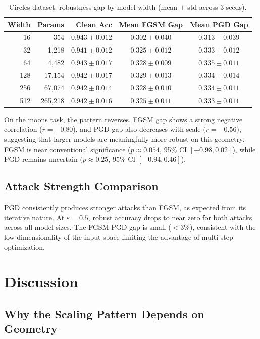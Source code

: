 \documentclass[11pt,a4paper]{article}
\begin{document}
\begin{table}[h]
\centering
\caption{Circles dataset: robustness gap by model width (mean $\pm$ std across 3 seeds).}
\label{tab:circles}
\begin{tabular}{rrrcc}
\toprule
Width & Params & Clean Acc & Mean FGSM Gap & Mean PGD Gap \\
\midrule
16    & 354      & $0.943 \pm 0.012$ & $0.302 \pm 0.040$ & $0.313 \pm 0.039$ \\
32    & 1{,}218  & $0.941 \pm 0.012$ & $0.325 \pm 0.012$ & $0.333 \pm 0.012$ \\
64    & 4{,}482  & $0.943 \pm 0.017$ & $0.328 \pm 0.009$ & $0.335 \pm 0.011$ \\
128   & 17{,}154 & $0.942 \pm 0.017$ & $0.329 \pm 0.013$ & $0.334 \pm 0.014$ \\
256   & 67{,}074 & $0.942 \pm 0.014$ & $0.328 \pm 0.010$ & $0.334 \pm 0.011$ \\
512   & 265{,}218& $0.942 \pm 0.016$ & $0.325 \pm 0.011$ & $0.333 \pm 0.011$ \\
\bottomrule
\end{tabular}
\end{table}

On the moons task, the pattern reverses.
FGSM gap shows a strong negative correlation ($r = -0.80$), and PGD gap also
decreases with scale ($r = -0.56$), suggesting that larger models are
meaningfully more robust on this geometry.
FGSM is near conventional significance ($p \approx 0.054$, 95\% CI $[-0.98, 0.02]$),
while PGD remains uncertain ($p \approx 0.25$, 95\% CI $[-0.94, 0.46]$).

\subsection{Attack Strength Comparison}

PGD consistently produces stronger attacks than FGSM, as expected from its iterative nature.
At $\varepsilon = 0.5$, robust accuracy drops to near zero for both attacks across all
model sizes. The FGSM-PGD gap is small ($<$3\%), consistent with the low dimensionality
of the input space limiting the advantage of multi-step optimization.

\section{Discussion}

\subsection{Why the Scaling Pattern Depends on Geometry}
\end{document}
